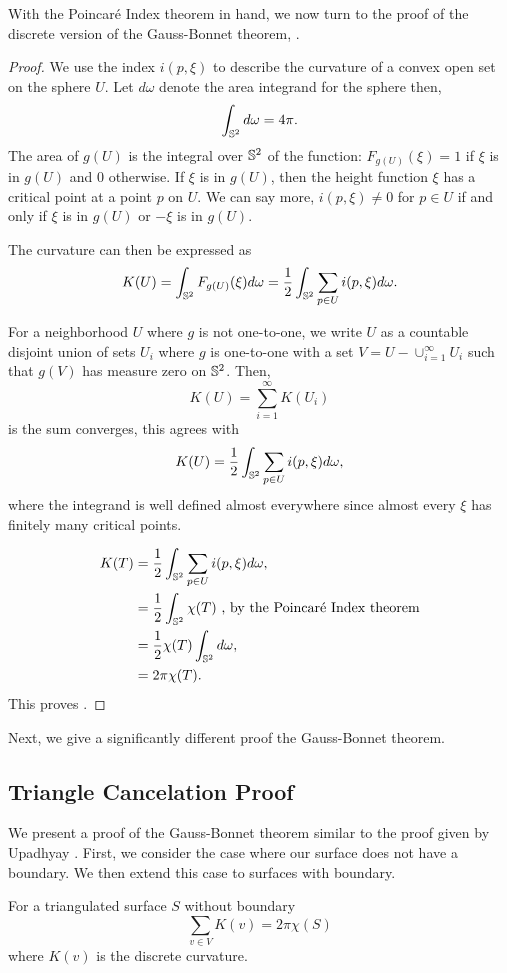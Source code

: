 With the Poincar\'e Index theorem in hand, we now turn to the proof of
the discrete version of the Gauss-Bonnet theorem, .
\begin{proof}


We use the index $i(p,\xi)$ to describe the curvature of a convex open
set on the sphere $U$. Let $d\omega$ denote the area integrand for the sphere
then,
$$\int_{\mathbb{S}^2} d\omega =4\pi.$$
The area of $g(U)$ is the integral over $\mathbb{S}^2$ of the function:
$F_{g(U)}(\xi)=1$ if $\xi$ is in $g(U)$ and $0$ otherwise.
If $\xi$ is in $g(U)$, then the height function $\xi$ has a critical point at
a point $p$ on $U$. We can say more, $i(p,\xi)\neq 0$ for $p\in U$ if and only if
$\xi$ is in $g(U)$ or $-\xi$ is in $g(U).$

The curvature can then be expressed as 
$$K(U)=\int_{\mathbb{S}^2}F_{g(U)}(\xi)d\omega =\frac{1}{2}\int_{\mathbb{S}^2}\sum_{p\in U} i(p,\xi)d\omega.$$


For a neighborhood $U$ where $g$ is not one-to-one, we write $U$ as a countable
disjoint union of sets $U_i$ where $g$ is one-to-one with a set $V=U-\cup_{i=1}^\infty U_i$
such that $g(V)$ has measure zero on $\mathbb{S}^2$. Then,
$$K(U)=\sum_{i=1}^\infty K(U_i)$$ is the sum converges, this agrees with 
$$K(U)=\frac{1}{2}\int_{\mathbb{S}^2}\sum_{p\in U} i(p,\xi)d\omega,$$
where the integrand is well defined almost everywhere since almost every $\xi$
has finitely many critical points.



\begin{align}
K(T) &=\frac{1}{2}\int_{\mathbb{S}^2}\sum_{p\in U} i(p,\xi)d\omega,  \\ \nonumber
       &=\frac{1}{2}\int_{\mathbb{S}^2}\chi(T) \text{ , by the Poincar\'e Index theorem}\\ \nonumber
       &=\frac{1}{2}\chi(T)\int_{\mathbb{S}^2}d\omega, \\ \nonumber
       &=2\pi\chi(T). \nonumber 
\end{align}
This proves .

\end{proof}
Next, we give a significantly different proof the Gauss-Bonnet theorem. 


\subsection{Triangle Cancelation Proof}
\label{sec:proof}


We present a proof of the Gauss-Bonnet theorem similar to the proof given by Upadhyay \cite{upadhyay2015}.
First, we consider the case where our surface does not have a boundary.
We then extend this case to surfaces with boundary.
\begin{theorem}\label{thm:g-b-discete-bdy}
For a triangulated surface $S$ without boundary
$$\sum_{v\in V} K(v)=2\pi \chi(S)$$
where $K(v)$ is the discrete curvature.
\end{theorem}

